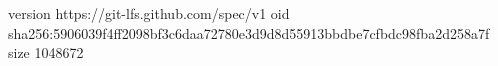 version https://git-lfs.github.com/spec/v1
oid sha256:5906039f4ff2098bf3c6daa72780e3d9d8d55913bbdbe7cfbdc98fba2d258a7f
size 1048672

